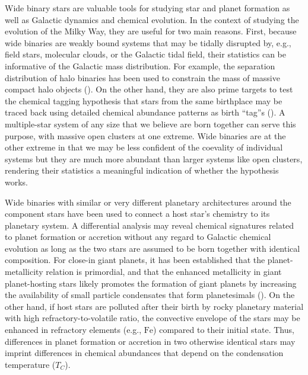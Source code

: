 \documentclass[modern, letterpaper]{aastex61}
\newcommand*\elem[1]{\ensuremath{\mathrm{#1}}}
\newcommand{\Tcondens}{\ensuremath{T_C}}
\begin{document}
Wide binary stars are valuable tools for studying star and planet formation as well
as Galactic dynamics and chemical evolution.
In the context of studying the evolution of the Milky Way, they are useful for
two main reasons.
First, because wide binaries are weakly bound systems that may be tidally
disrupted by, e.g., field stars, molecular clouds, or the Galactic tidal field,
their statistics can be informative of the Galactic mass distribution.
For example, the separation distribution of halo binaries has been used to
constrain the mass of massive compact halo objects (\citealt{Yoo:2004aa}).
On the other hand, they are also prime targets to test the chemical tagging
hypothesis that stars from the same birthplace may be traced back using detailed
chemical abundance patterns as birth ``tag''s (\citealt{2002ARA&A..40..487F}).
A multiple-star system of any size that we believe are born together can serve
this purpose, with massive open clusters at one extreme.
Wide binaries are at the other extreme in that we may be less confident of the
coevality of individual systems but they are much more abundant than larger
systems like open clusters, rendering their statistics a meaningful indication
of whether the hypothesis works.

Wide binaries with similar or very different planetary architectures around the
component stars have been used to connect a host star's chemistry to its
planetary system.
A differential analysis may reveal chemical signatures related to planet
formation or accretion without any regard to Galactic chemical evolution as
long as the two stars are assumed to be born together with identical
composition.
For close-in giant planets, it has been established that the planet-metallicity
relation is primordial, and that the enhanced metallicity in giant
planet-hosting stars likely promotes the formation of giant planets by
increasing the availability of small particle condensates that form
planetesimals (\citealt{Fischer:2005aa}).
On the other hand, if host stars are polluted after their birth by rocky
planetary material with high refractory-to-volatile ratio, the convective
envelope of the stars may be enhanced in refractory elements (e.g., \elem{Fe})
compared to their initial state.
Thus, differences in planet formation or accretion in two otherwise identical
stars may imprint differences in chemical abundances that depend on the
condensation temperature (\Tcondens).
\end{document}
